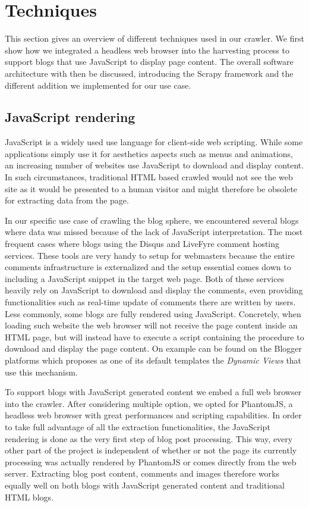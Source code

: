 \section{Techniques}

This section gives an overview of different techniques used in our crawler. We first show how we integrated a headless web browser into the harvesting process to support blogs that use JavaScript to display page content. The overall software architecture with then be discussed, introducing the Scrapy framework and the different addition we implemented for our use case.

\subsection{JavaScript rendering}
JavaScript is a widely used use language for client-side web scripting. While some applications simply use it for aesthetics aspects such as menus and animations, an increasing number of websites use JavaScript to download and display content. In such circumstances, traditional HTML based crawled would not see the web site as it would be presented to a human visitor and might therefore be obsolete for extracting data from the page.

In our specific use case of crawling the blog sphere, we encountered several blogs where data was missed because of the lack of JavaScript interpretation. The most frequent cases where blogs using the Disqus\cite{disqus2013} and LiveFyre\cite{livefyre2013} comment hosting services. These tools are very handy to setup for webmasters because the entire comments infrastructure is externalized and the setup essential comes down to including a JavaScript snippet in the target web page. Both of these services heavily rely on JavaScript to download and display the comments, even providing functionalities such as real-time update of comments there are written by users. Less commonly, some blogs are fully rendered using JavaScript. Concretely, when loading such website the web browser will not receive the page content inside an HTML page, but will instead have to execute a script containing the procedure to download and display the page content. On example can be found on the Blogger platforms which proposes as one of its default templates the \emph{Dynamic Views} \cite{antinharasymiv2011} that use this mechanism.

To support blogs with JavaScript generated content we embed a full web browser into the crawler. After considering multiple option, we opted for PhantomJS\cite{phantomjs2013}, a headless web browser with great performances and scripting capabilities. In order to take full advantage of all the extraction functionalities, the JavaScript rendering is done as the very first step of blog post processing. This way, every other part of the project is independent of whether or not the page its currently processing was actually rendered by PhantomJS or comes directly from the web server. Extracting blog post content, comments and images therefore works equally well on both blogs with JavaScript generated content and traditional HTML blogs.


